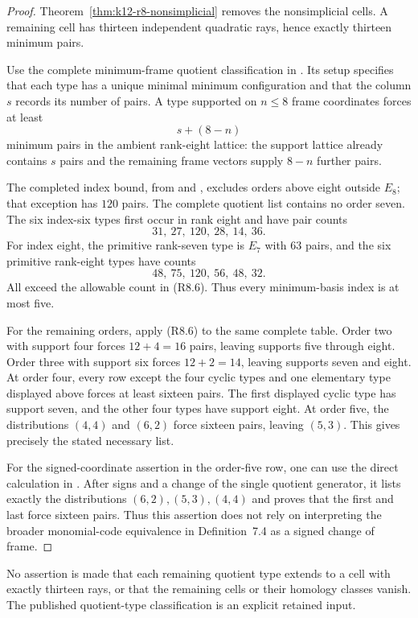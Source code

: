 \begin{proof}
Theorem~\ref{thm:k12-r8-nonsimplicial} removes the nonsimplicial
cells. A remaining cell has thirteen independent quadratic rays,
hence exactly thirteen minimum pairs.

Use the complete minimum-frame quotient classification in
\cite[\S11 and Table~11.1, author PDF pp.~45--48]{MartinetIndex2001}.
Its setup specifies that each type has a unique minimal minimum
configuration and that the column $s$ records its number of pairs.
A type supported on $n\leq8$ frame coordinates forces at least
\[
                           s+(8-n)                     \tag{R8.6}
\]
minimum pairs in the ambient rank-eight lattice: the support
lattice already contains $s$ pairs and the remaining frame vectors
supply $8-n$ further pairs.

The completed index bound, from
\cite[appendix]{MartinetIndexErrata2014} and
\cite[Theorem~10.1]{MartinetIndex2001}, excludes orders above eight
outside $E_8$; that exception has $120$ pairs. The complete quotient
list contains no order seven. The six index-six types first occur
in rank eight and have pair counts
\[
                     31,\ 27,\ 120,\ 28,\ 14,\ 36.
\]
For index eight, the primitive rank-seven type is $E_7$ with
$63$ pairs, and the six primitive rank-eight types have counts
\[
                     48,\ 75,\ 120,\ 56,\ 48,\ 32.
\]
All exceed the allowable count in (R8.6). Thus every minimum-basis
index is at most five.

For the remaining orders, apply (R8.6) to the same complete table.
Order two with support four forces $12+4=16$ pairs, leaving
supports five through eight. Order three with support six forces
$12+2=14$, leaving supports seven and eight. At order four, every
row except the four cyclic types and one elementary type displayed
above forces at least sixteen pairs. The first displayed cyclic
type has support seven, and the other four types have support
eight. At order five, the distributions $(4,4)$ and $(6,2)$ force
sixteen pairs, leaving $(5,3)$. This gives precisely the stated
necessary list.

For the signed-coordinate assertion in the order-five row, one can
use the direct calculation in \cite[\S9, case $d=5$, p.~31;
Proposition~9.1 and proof, p.~33]{MartinetIndex2001}.
After signs and a change of the single quotient generator, it lists
exactly the distributions $(6,2),(5,3),(4,4)$ and proves that the
first and last force sixteen pairs. Thus this assertion does not
rely on interpreting the broader monomial-code equivalence in
Definition~7.4 as a signed change of frame.
\end{proof}

No assertion is made that each remaining quotient type extends to
a cell with exactly thirteen rays, or that the remaining cells or
their homology classes vanish. The published quotient-type
classification is an explicit retained input.
